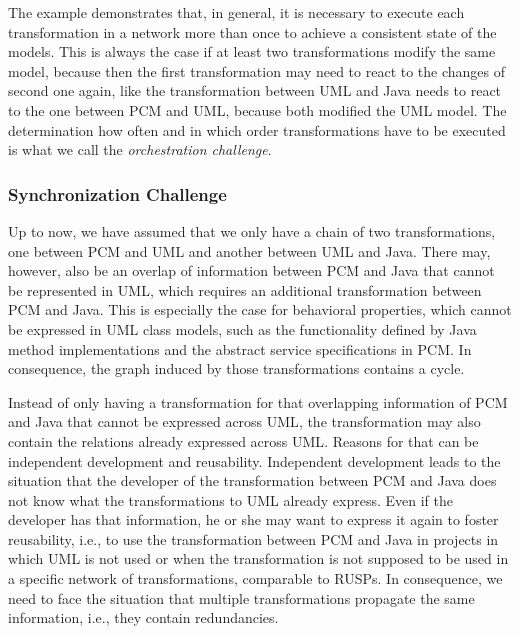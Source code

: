 The example demonstrates that, in general, it is necessary to execute each transformation in a network more than once to achieve a consistent state of the models.
This is always the case if at least two transformations modify the same model, because then the first transformation may need to react to the changes of second one again, like the transformation between \gls{UML} and Java needs to react to the one between \gls{PCM} and \gls{UML}, because both modified the \gls{UML} model.
The determination how often and in which order transformations have to be executed is what we call the \emph{orchestration challenge}.

\subsubsection*{Synchronization Challenge}
\label{chap:introduction:challenges:correctness:synchronization}
Up to now, we have assumed that we only have a chain of two transformations, one between \gls{PCM} and \gls{UML} and another between \gls{UML} and Java.
There may, however, also be an overlap of information between \gls{PCM} and Java that cannot be represented in \gls{UML}, which requires an additional transformation between \gls{PCM} and Java.
This is especially the case for behavioral properties, which cannot be expressed in UML class models, such as the functionality defined by Java method implementations and the abstract service specifications in \gls{PCM}.
In consequence, the graph induced by those transformations contains a cycle.

Instead of only having a transformation for that overlapping information of \gls{PCM} and Java that cannot be expressed across \gls{UML}, the transformation may also contain the relations already expressed across \gls{UML}.
Reasons for that can be independent development and reusability.
Independent development leads to the situation that the developer of the transformation between \gls{PCM} and Java does not know what the transformations to \gls{UML} already express.
Even if the developer has that information, he or she may want to express it again to foster reusability, i.e., to use the transformation between \gls{PCM} and Java in projects in which \gls{UML} is not used or when the transformation is not supposed to be used in a specific network of transformations, comparable to \glspl{RUSP}.
In consequence, we need to face the situation that multiple transformations propagate the same information, i.e., they contain redundancies.

